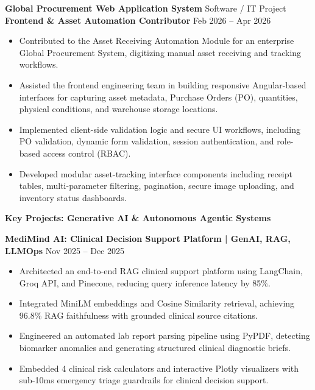 \documentclass[10pt]{article}
\begin{document}
\vspace{8pt}

\textbf{Global Procurement Web Application System} \hfill Software / IT Project\\
\textbf{Frontend \& Asset Automation Contributor} \hfill Feb 2026 -- Apr 2026
\begin{itemize}[noitemsep, topsep=2pt, partopsep=0pt, parsep=1.5pt]
    \item Contributed to the Asset Receiving Automation Module for an enterprise Global Procurement System, digitizing manual asset receiving and tracking workflows.
    \item Assisted the frontend engineering team in building responsive Angular-based interfaces for capturing asset metadata, Purchase Orders (PO), quantities, physical conditions, and warehouse storage locations.
    \item Implemented client-side validation logic and secure UI workflows, including PO validation, dynamic form validation, session authentication, and role-based access control (RBAC).
    \item Developed modular asset-tracking interface components including receipt tables, multi-parameter filtering, pagination, secure image uploading, and inventory status dashboards.
\end{itemize}

\newpage

\begin{center}
    \textbf{Key Projects: Generative AI \& Autonomous Agentic Systems}
\end{center}
\vspace{-4pt}

\textbf{MediMind AI: Clinical Decision Support Platform | GenAI, RAG, LLMOps} \hfill Nov 2025 -- Dec 2025
\begin{itemize}[noitemsep, topsep=2pt, partopsep=0pt, parsep=1.5pt]
    \item Architected an end-to-end RAG clinical support platform using LangChain, Groq API, and Pinecone, reducing query inference latency by 85\%.
    \item Integrated MiniLM embeddings and Cosine Similarity retrieval, achieving 96.8\% RAG faithfulness with grounded clinical source citations.
    \item Engineered an automated lab report parsing pipeline using PyPDF, detecting biomarker anomalies and generating structured clinical diagnostic briefs.
    \item Embedded 4 clinical risk calculators and interactive Plotly visualizers with sub-10ms emergency triage guardrails for clinical decision support.
\end{itemize}
\end{document}
